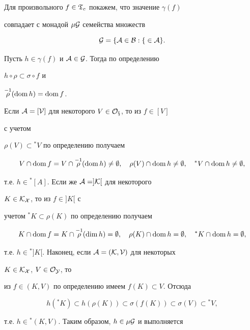\begin{pf}


Для произвольного $f\in\frak T_c$ покажем, что значение $\gamma(f)$


совпадает с монадой $\mu\cal G$ семейства множеств


$$


\cal G=\{\cal A\in\cal B:f\in\cal A\}.


$$





Пусть $h\in\gamma(f)$ и $\cal A\in\cal G$. Тогда по определению


$h\circ \rho\subset\sigma\circ f$ и


$\overset{-1}{\rho}{} (\operatorname{dom} h)=\operatorname{dom} f$.


Если $\cal A=[V]$ для некоторого $V\in\cal O_x$, то из $f\in[V]$


с учетом


$\rho(V)\subset{}^*V$ по определению получаем


$$


V\cap\dom f=V\cap\mir (\dom h)\ne\emptyset,\quad


\rho(V)\cap\dom h\ne\emptyset,\quad


{}^*V\cap\dom h\ne\emptyset,


$$


т.е. $h\in{}^*[A]$. Если же $\cal A=]K[$ для некоторого


$K\in\cal K_X$, то из $f\in]K[$ с


учетом ${}^*K\subset\rho(K)$ по определению получаем


$$


K\cap\dom f=K\cap\mir (\dim h)=\emptyset,\quad


\rho(K)\cap\dom h=\emptyset,\quad


{}^*K\cap\dom h=\emptyset,


$$


т.е. $h\in{}^*]K[$. Наконец, если $\cal A=(K,V)$ для некоторых


$K\in\cal K_X$, $V\in\cal O_Y$, то


из $f\in(K,V)$ по определению имеем $f(K)\subset V$. Отсюда


$$


h({}^*K)\subset h(\rho(K))\subset\sigma(f(K))


\subset\sigma(V)\subset{}^*V,


$$


т.е. $h\in{}^*(K,V)$. Таким образом, $h\in\mu\cal G$ и выполняется



\end{pf}
